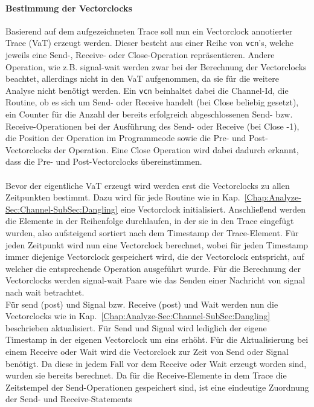 \paragraph{Bestimmung der Vectorclocks}
Basierend auf dem aufgezeichneten Trace soll nun ein Vectorclock annotierter Trace 
(VaT) erzeugt werden. Dieser besteht aus einer Reihe von \texttt{vcn}'s, 
welche jeweils eine Send-, Receive- oder Close-Operation repräsentieren.
Andere Operation, wie z.B. signal-wait werden zwar bei der Berechnung der Vectorclocks 
beachtet, allerdings nicht in den VaT aufgenommen, da sie für die weitere 
Analyse nicht benötigt werden. Ein \texttt{vcn} beinhaltet dabei die Channel-Id,
die Routine, ob es sich um Send- oder Receive handelt (bei Close beliebig gesetzt),
ein Counter für die Anzahl der bereits erfolgreich abgeschlossenen Send- bzw.
Receive-Operationen bei der Ausführung des Send- oder Receive (bei Close -1), 
die Position der Operation im Programmcode
sowie die Pre- und Post-Vectorclocks der Operation. Eine Close Operation 
wird dabei dadurch erkannt, dass die Pre- und Post-Vectorclocks übereinstimmen.\\\\
Bevor der eigentliche VaT erzeugt wird werden erst die Vectorclocks zu allen
Zeitpunkten bestimmt. Dazu wird für jede Routine wie in 
Kap.~\ref{Chap:Analyze-Sec:Channel-SubSec:Dangling} eine Vectorclock initialisiert. 
Anschließend werden die Elemente in der Reihenfolge durchlaufen, in der sie 
in den Trace eingefügt wurden, also aufsteigend sortiert nach dem Timestamp 
der Trace-Element. Für jeden Zeitpunkt wird nun eine Vectorclock berechnet,
wobei für jeden Timestamp immer diejenige Vectorclock gespeichert wird, die 
der Vectorclock entspricht, auf welcher die entsprechende Operation ausgeführt wurde.
Für die Berechnung der Vectorclocks werden signal-wait Paare wie das Senden 
einer Nachricht von signal nach wait betrachtet.\\
Für send (post) und Signal bzw. Receive (post) und Wait werden nun die Vectorclocks 
wie in Kap.~\ref{Chap:Analyze-Sec:Channel-SubSec:Dangling} beschrieben aktualisiert.
Für Send und Signal wird lediglich der eigene Timestamp in der eigenen 
Vectorclock um eins erhöht. Für die Aktualisierung bei einem Receive oder Wait 
wird die Vectorclock zur Zeit von Send oder Signal benötigt. Da diese in jedem 
Fall vor dem Receive oder Wait erzeugt worden sind, wurden sie bereits berechnet.
Da für die Receive-Elemente in dem Trace die Zeitstempel der Send-Operationen 
gespeichert sind, ist eine eindeutige Zuordnung der Send- und Receive-Statements 
